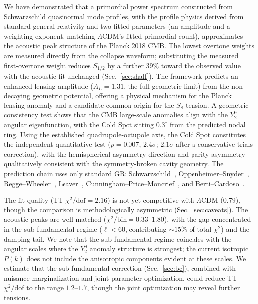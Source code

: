 \documentclass[aps,prd,twocolumn,superscriptaddress,showpacs,preprintnumbers,amsmath,amssymb,nofootinbib]{revtex4-2}
\newcommand{\lcdm}{$\Lambda$CDM}
\begin{document}
We have demonstrated that a primordial power spectrum constructed from Schwarzschild quasinormal mode profiles, with the profile physics derived from standard general relativity and two fitted parameters (an amplitude and a weighting exponent, matching \lcdm's fitted primordial count), approximates the acoustic peak structure of the Planck 2018 CMB. The lowest overtone weights are measured directly from the collapse waveform; substituting the measured first-overtone weight reduces $S_{1/2}$ by a further 39\% toward the observed value with the acoustic fit unchanged (Sec.~\ref{sec:shalf}). The framework predicts an enhanced lensing amplitude ($A_L = 1.31$, the full-geometric limit) from the non-decaying geometric potential, offering a physical mechanism for the Planck lensing anomaly and a candidate common origin for the $S_8$ tension. A geometric consistency test shows that the CMB large-scale anomalies align with the $Y_2^0$ angular eigenfunction, with the Cold Spot sitting $0.3^{\circ}$ from the predicted nodal ring. Using the established quadrupole-octupole axis, the Cold Spot constitutes the independent quantitative test ($p = 0.007$, $2.4\sigma$; $2.1\sigma$ after a conservative trials correction), with the hemispherical asymmetry direction and parity asymmetry qualitatively consistent with the symmetry-broken cavity geometry. The prediction chain uses only standard GR: Schwarzschild~\cite{Schwarzschild1916}, Oppenheimer--Snyder~\cite{OppenheimerSnyder1939}, Regge--Wheeler~\cite{ReggeWheeler1957}, Leaver~\cite{Leaver1985,Leaver1986}, Cunningham--Price--Moncrief~\cite{CPM1978,CPM1979}, and Berti--Cardoso~\cite{BertiCardoso2006}.

The fit quality (TT $\chi^2/\mathrm{dof} = 2.16$) is not yet competitive with \lcdm{} ($0.79$), though the comparison is methodologically asymmetric (Sec.~\ref{sec:caveats}). The acoustic peaks are well-matched ($\chi^2/\mathrm{bin} = 0.33$--$1.80$), with the gap concentrated in the sub-fundamental regime ($\ell < 60$, contributing $\sim 15\%$ of total $\chi^2$) and the damping tail. We note that the sub-fundamental regime coincides with the angular scales where the $Y_2^0$ anomaly structure is strongest; the current isotropic $P(k)$ does not include the anisotropic components evident at these scales. We estimate that the sub-fundamental correction (Sec.~\ref{sec:bc}), combined with nuisance marginalization and joint parameter optimization, could reduce TT $\chi^2/\mathrm{dof}$ to the range $1.2$--$1.7$, though the joint optimization may reveal further tensions.
\end{document}
